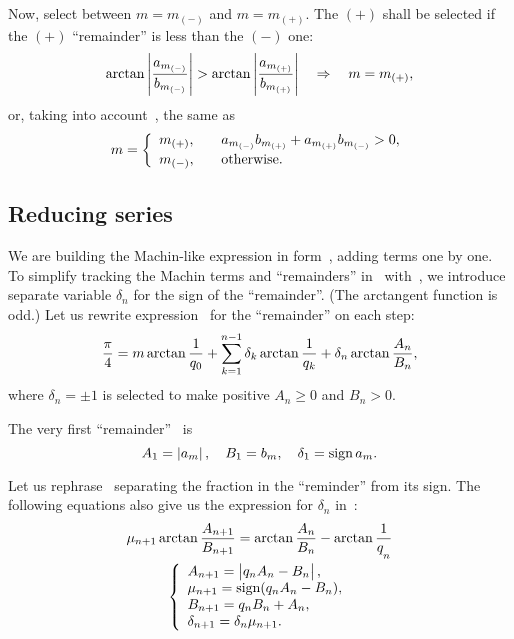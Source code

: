 \documentclass[draft, 10pt]{article} %
\begin{document}
Now, select between $m = m_{(-)}$ and $m = m_{(+)}$. The $(+)$ shall be
selected if the $(+)$ ``remainder'' is less than the $(-)$ one:
$$
\arctan\left| \displaystyle\frac{a_{m_{(-)}}}{b_{m_{(-)}}} \right| >
    \arctan\left| \displaystyle\frac{a_{m_{(+)}}}{b_{m_{(+)}}} \right|
\quad\Rightarrow\quad m = m_{(+)},
$$
or, taking into account~, the same as
%
\begin{equation}\mlabel{m-zero}
m = \left\{
\begin{array}{ll}
m_{(+)}, \quad & a_{m_{(-)}} b_{m_{(+)}} + a_{m_{(+)}} b_{m_{(-)}} > 0, \\[0.2em]
m_{(-)}, & \hbox{otherwise.}
\end{array}
\right.
\end{equation}

\subsection{Reducing series}

We are building the Machin-like expression in form~, adding
terms one by one.
To simplify tracking the Machin terms and ``remainders'' in~
with~, we introduce separate variable $\delta_n$ for the sign of the ``remainder''.
(The arctangent function is odd.)
Let us rewrite expression~ for the ``remainder''
on each step:
%
\begin{equation}\mlabel{remainder-delta}
\dfrac{\pi}{4} = m \arctan\dfrac{1}{q_0}
    + \sum_{k=1}^{n-1} \delta_k \arctan\dfrac{1}{q_k}
    + \delta_n \arctan\dfrac{A_n}{B_n},
\end{equation}
where $\delta_n = \pm 1$ is selected to make positive $A_n \ge 0$ and $B_n > 0$.

The very first ``remainder''~ is
%
\begin{equation}\mlabel{remainder-first}
A_1 = \absolute{a_m}, \quad
B_1 = b_m, \quad
\delta_1 = \sign a_m.
\end{equation}

Let us rephrase~ separating the fraction in the ``reminder'' from its sign.
The following equations also give us the expression for $\delta_n$ in~:
%
\begin{equation}\mlabel{evolve-signed}
\begin{array}{c}
\mu_{n+1} \arctan\dfrac{A_{n+1}}{B_{n+1}} =
    \arctan\dfrac{A_n}{B_n} - \arctan\dfrac{1}{q_{n \strut}} \\
\left\{\begin{array}{l}
A_{n+1} = \absolute{q_n A_n - B_n \strut}, \\
\mu_{n+1} = \sign (q_n A_n - B_n), \\
B_{n+1} = q_n B_n + A_n, \\
\delta_{n+1} = \delta_n \mu_{n+1}.
\end{array}\right.
\end{array}
\end{equation}
\end{document}

